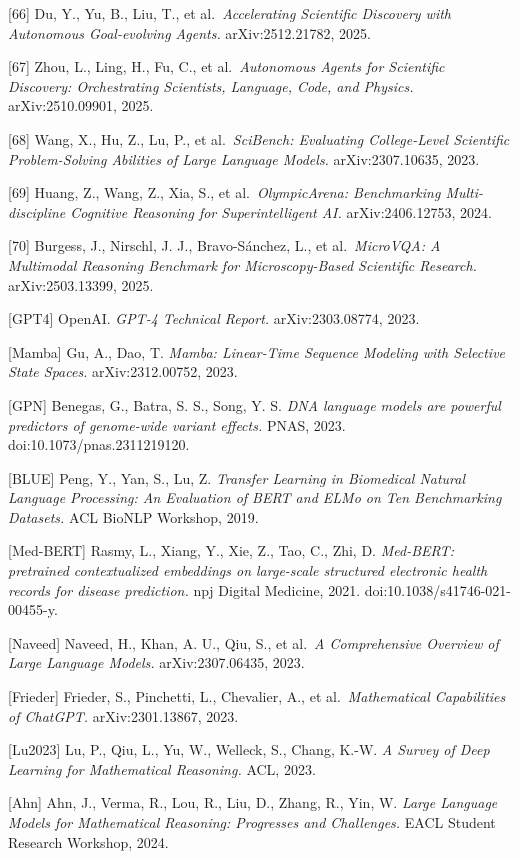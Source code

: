 {[}66{]} Du, Y., Yu, B., Liu, T., et al.~\emph{Accelerating Scientific Discovery with Autonomous Goal-evolving Agents.} arXiv:2512.21782, 2025.

{[}67{]} Zhou, L., Ling, H., Fu, C., et al.~\emph{Autonomous Agents for Scientific Discovery: Orchestrating Scientists, Language, Code, and Physics.} arXiv:2510.09901, 2025.

{[}68{]} Wang, X., Hu, Z., Lu, P., et al.~\emph{SciBench: Evaluating College-Level Scientific Problem-Solving Abilities of Large Language Models.} arXiv:2307.10635, 2023.

{[}69{]} Huang, Z., Wang, Z., Xia, S., et al.~\emph{OlympicArena: Benchmarking Multi-discipline Cognitive Reasoning for Superintelligent AI.} arXiv:2406.12753, 2024.

{[}70{]} Burgess, J., Nirschl, J. J., Bravo-Sánchez, L., et al.~\emph{MicroVQA: A Multimodal Reasoning Benchmark for Microscopy-Based Scientific Research.} arXiv:2503.13399, 2025.

{[}GPT4{]} OpenAI. \emph{GPT-4 Technical Report.} arXiv:2303.08774, 2023.

{[}Mamba{]} Gu, A., Dao, T. \emph{Mamba: Linear-Time Sequence Modeling with Selective State Spaces.} arXiv:2312.00752, 2023.

{[}GPN{]} Benegas, G., Batra, S. S., Song, Y. S. \emph{DNA language models are powerful predictors of genome-wide variant effects.} PNAS, 2023. doi:10.1073/pnas.2311219120.

{[}BLUE{]} Peng, Y., Yan, S., Lu, Z. \emph{Transfer Learning in Biomedical Natural Language Processing: An Evaluation of BERT and ELMo on Ten Benchmarking Datasets.} ACL BioNLP Workshop, 2019.

{[}Med-BERT{]} Rasmy, L., Xiang, Y., Xie, Z., Tao, C., Zhi, D. \emph{Med-BERT: pretrained contextualized embeddings on large-scale structured electronic health records for disease prediction.} npj Digital Medicine, 2021. doi:10.1038/s41746-021-00455-y.

{[}Naveed{]} Naveed, H., Khan, A. U., Qiu, S., et al.~\emph{A Comprehensive Overview of Large Language Models.} arXiv:2307.06435, 2023.

{[}Frieder{]} Frieder, S., Pinchetti, L., Chevalier, A., et al.~\emph{Mathematical Capabilities of ChatGPT.} arXiv:2301.13867, 2023.

{[}Lu2023{]} Lu, P., Qiu, L., Yu, W., Welleck, S., Chang, K.-W. \emph{A Survey of Deep Learning for Mathematical Reasoning.} ACL, 2023.

{[}Ahn{]} Ahn, J., Verma, R., Lou, R., Liu, D., Zhang, R., Yin, W. \emph{Large Language Models for Mathematical Reasoning: Progresses and Challenges.} EACL Student Research Workshop, 2024.

